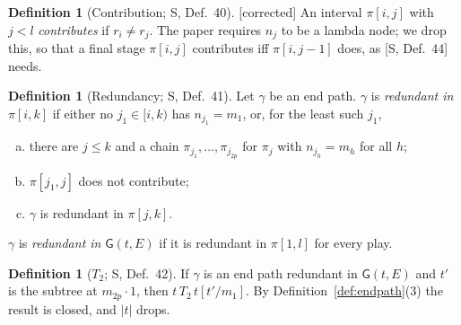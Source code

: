 \documentclass[11pt]{article}
\newcommand{\Gm}{\mathsf{G}}
\newcommand{\suc}[2]{#1{\cdot}#2}
\newcommand{\iv}[2]{\pi[#1,#2]}
\newcommand{\Fixed}{\textsf{[corrected]}}
\theoremstyle{plain}
\theoremstyle{definition}
\newtheorem{definition}[theorem]{Definition}
\theoremstyle{remark}
\begin{document}
\begin{definition}[Contribution; S, Def.~40]\label{def:contrib}
\Fixed{} An interval $\iv ij$ with $j<l$ \emph{contributes} if
$r_i\ne r_j$.  The paper requires $n_j$ to be a lambda node; we drop
this, so that a final stage $\iv ij$ contributes iff $\iv i{j-1}$ does,
as [S, Def.~44] needs.
\end{definition}

\begin{definition}[Redundancy; S, Def.~41]\label{def:redundant}
Let $\gamma$ be an end path.  $\gamma$ is \emph{redundant in} $\iv ik$ if
either no $j_1\in[i,k)$ has $n_{j_1}=m_1$, or, for the least such $j_1$,
\begin{enumerate}[(a)]
\item there are $j\le k$ and a chain $\pi_{j_1},\dots,\pi_{j_{2p}}$ for
  $\pi_j$ with $n_{j_h}=m_h$ for all $h$;
\item $\iv{j_1}j$ does not contribute;
\item $\gamma$ is redundant in $\iv jk$.
\end{enumerate}
$\gamma$ is \emph{redundant in} $\Gm(t,E)$ if it is redundant in $\iv1l$
for every play.
\end{definition}

\begin{definition}[$T_2$; S, Def.~42]
If $\gamma$ is an end path redundant in $\Gm(t,E)$ and $t'$ is the
subtree at $\suc{m_{2p}}1$, then $t\,T_2\,t[t'/m_1]$.  By
Definition~\ref{def:endpath}(3) the result is closed, and $|t|$ drops.
\end{definition}
\end{document}
